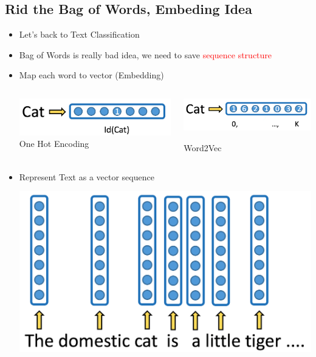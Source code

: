 \documentclass{beamer}
\begin{document}
	\subsection*{Rid the Bag of Words, Embeding Idea}
	\begin{frame}
		\begin{itemize}
			\item Let's back to Text Classification
			\item Bag of Words is really bad idea, we need to save \textcolor{red}{sequence structure}
			\item Map each word to vector (Embedding)
			
		 \vspace{0.4cm}
		 \begin{columns}[onlytextwidth]
		 	\begin{column}{0.4\textwidth}
		 		\centering \includegraphics[scale=0.2]{img/one_hot} 
				\centering \hspace{1cm} One Hot Encoding
		 	\end{column}
		 	
			 \begin{column}{0.5\textwidth}
			 	\centering \includegraphics[scale=0.2]{img/w2v} 
			 	
				\centering Word2Vec
			 \end{column}			 
		\end{columns}
		
		\vspace{0.4cm}
		\item Represent Text as a vector sequence
		
		\begin{center}
			\includegraphics[scale=0.16]{img/text_repr} 
		\end{center} 
		

\end{itemize}
\end{frame}
\end{document}
